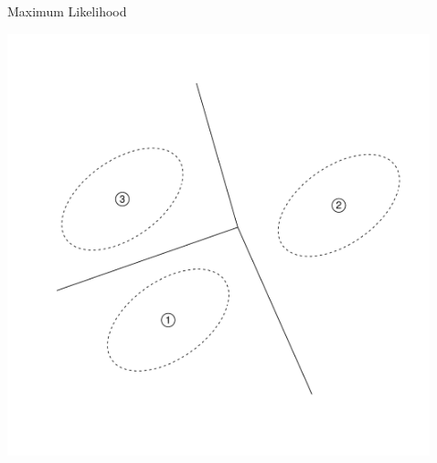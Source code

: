 \documentclass[final]{beamer}
\newlength{\sepwid}
\newlength{\onecolwid}
\begin{document}
\begin{frame}[t]
\begin{columns}[t]
\begin{column}{\onecolwid}
\begin{block}{Maximum Likelihood}
\begin{center}
\includegraphics[scale = 1.0]{illus1_A.pdf}
\end{center}


\end{block}


\end{column} %

\begin{column}{\sepwid}\end{column} %


\begin{column}{\onecolwid}


\end{column}
\end{columns}
\end{frame}
\end{document}

